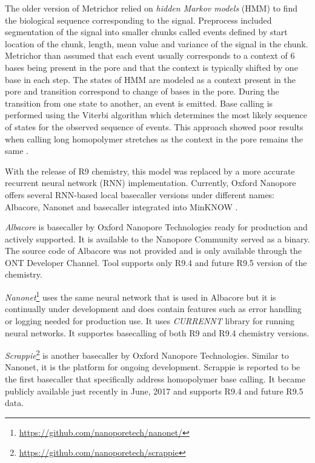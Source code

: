 \documentclass[times, utf8, diplomski, english]{fer}
\begin{document}
The older version of Metrichor relied on \textit{hidden Markov models} (HMM) to find the biological sequence corresponding to the signal. Preprocess included segmentation of the signal into smaller chunks called events defined by start location of the chunk, length, mean value and variance of the signal in the chunk. Metrichor than assumed that each event usually corresponds to a context of 6 bases being present in the pore and that the context is typically shifted by one base in each step. 
The states of HMM are modeled as a context present in the pore and transition correspond to change of bases in the pore. During the transition from one state to another, an event is emitted. Base calling is performed using the Viterbi algorithm which determines the most likely sequence of states for the observed sequence of events. This approach showed poor results when calling long homopolymer stretches as the context in the pore remains the same \cite{homopolymers}\cite{homopolimeri_analiza}.

With the release of R9 chemistry, this model was replaced by a more accurate recurrent neural network (RNN) implementation. Currently, Oxford Nanopore offers several RNN-based local basecaller versions under different names: Albacore, Nanonet and basecaller integrated into MinKNOW \cite{ont-basecallers}.   

\textit{Albacore} is basecaller by Oxford Nanopore Technologies ready for production and actively supported.
It is available to the Nanopore Community served as a binary. The source code of Albacore was not provided and is only available through the ONT Developer Channel. Tool supports only R9.4 and future R9.5 version of the chemistry.

\textit{Nanonet}\footnote{\url{https://github.com/nanoporetech/nanonet/}} uses the same neural network that is used in Albacore but it is continually under development and does contain features such as error handling or logging needed for production use. It uses \textit{CURRENNT} library for running neural networks. It supportes basecalling of both R9 and R9.4 chemistry versions.


\textit{Scrappie}\footnote{\url{https://github.com/nanoporetech/scrappie}} is another basecaller by Oxford Nanopore Technologies. Similar to Nanonet, it is the platform for ongoing development. Scrappie is reported to be the first basecaller  that specifically address homopolymer base calling. It became publicly available just recently in June, 2017 and supports R9.4 and future R9.5 data.
\end{document}
